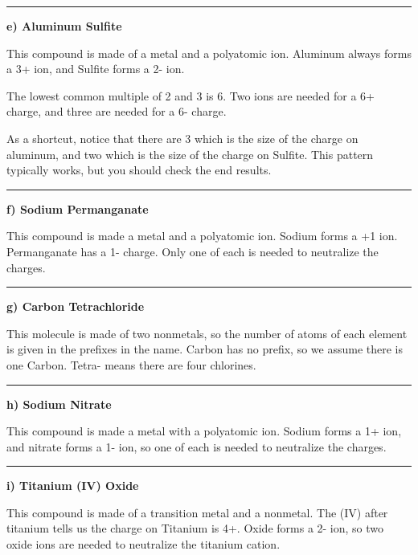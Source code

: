 \documentclass[12pt, oneside, letterpaper]{book}
\begin{document}


\hrule

\textbf{e) Aluminum Sulfite}

This compound is made of a metal and a polyatomic ion. Aluminum always forms a 3+ ion, and Sulfite forms a 2- ion. 

The lowest common multiple of 2 and 3 is 6. Two  ions are needed for a 6+ charge, and three  are needed for a 6- charge. 



As a shortcut, notice that there are 3  which is the size of the charge on aluminum, and two  which is the size of the charge on Sulfite. This pattern typically works, but you should check the end results.

\hrule

\textbf{f) Sodium Permanganate}

This compound is made a metal and a polyatomic ion. Sodium forms a +1 ion. Permanganate has a 1- charge. Only one of each is needed to neutralize the charges. 



\hrule

\textbf{g) Carbon Tetrachloride}

This molecule is made of two nonmetals, so the number of atoms of each element is given in the prefixes in the name. Carbon has no prefix, so we assume there is one Carbon. Tetra- means there are four chlorines.



\hrule

\textbf{h) Sodium Nitrate}

This compound is made a metal with a polyatomic ion. Sodium forms a 1+ ion, and nitrate forms a 1- ion, so one of each is needed to neutralize the charges. 



\hrule

\textbf{i) Titanium (IV) Oxide}


This compound is made of a transition metal and a nonmetal. The (IV) after titanium tells us the charge on Titanium is 4+. Oxide forms a 2- ion, so two oxide ions are needed to neutralize the titanium cation. 

\end{document}
